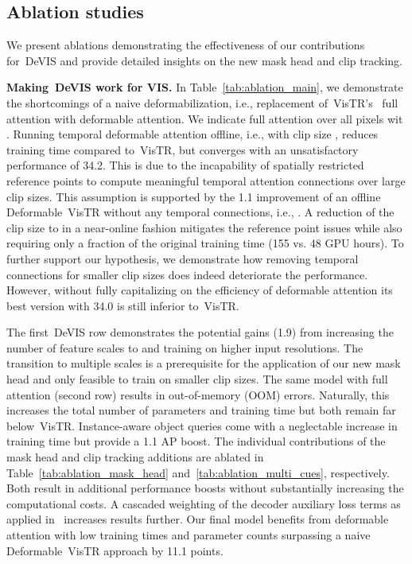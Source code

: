 \documentclass[runningheads]{llncs}
\newcommand{\vistr}{\mbox{VisTR}}
\newcommand{\evis}{\mbox{DeVIS}}
\newcommand{\ie}{i.e.}
\begin{document}
\begin{table*}[t]
{\begin{tabular}{lrccc | cccHc}
\bottomrule

\end{tabular}
}

\vspace{-0.5cm}

\end{table*} 
\subsection{Ablation studies}

We present ablations demonstrating the effectiveness of our contributions for~\evis{} and provide detailed insights on the new mask head and clip tracking.

\noindent \textbf{Making~\evis{} work for VIS.}
In Table~\ref{tab:ablation_main}, we demonstrate the shortcomings of a naive deformabilization, \ie, replacement of~\vistr{}'s~\cite{vistr} full attention with deformable attention.
We indicate full attention over all pixels wit .
Running temporal deformable attention offline, \ie, with clip size , reduces training time compared to~\vistr{}, but converges with an unsatisfactory performance of 34.2.
This is due to the incapability of spatially restricted reference points to compute meaningful temporal attention connections over large clip sizes.
This assumption is supported by the 1.1 improvement of an offline Deformable~\vistr{} without any temporal connections, \ie, .
A reduction of the clip size to  in a near-online fashion mitigates the reference point issues while also requiring only a fraction of the original training time (155 vs. 48 GPU hours).
To further support our hypothesis, we demonstrate how removing temporal connections  for smaller clip sizes  does indeed deteriorate the performance.
However, without fully capitalizing on the efficiency of deformable attention its best version with 34.0 is still inferior to~\vistr{}.

The first~\evis{} row demonstrates the potential gains (1.9) from increasing the number of feature scales to  and training on higher input resolutions.
The transition to multiple scales is a prerequisite for the application of our new mask head and only feasible to train on smaller clip sizes.
The same model with full attention (second row) results in out-of-memory (OOM) errors.
Naturally, this increases the total number of parameters and training time but both remain far below~\vistr{}.
Instance-aware object queries come with a neglectable increase in training time but provide a 1.1 AP boost.
The individual contributions of the mask head and clip tracking additions are ablated in Table~\ref{tab:ablation_mask_head} and~\ref{tab:ablation_multi_cues}, respectively.
Both result in additional performance boosts without substantially increasing the computational costs.
A cascaded weighting of the decoder auxiliary loss terms as applied in~\cite{AuxLoss} increases results further.
Our final model benefits from deformable attention with low training times and parameter counts surpassing a naive Deformable~\vistr{} approach by 11.1 points.
\end{document}
